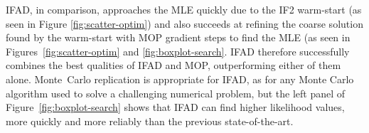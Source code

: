 \documentclass[11pt]{article}
\begin{document}
IFAD, in comparison, approaches the MLE quickly due to the IF2 warm-start (as seen in Figure \ref{fig:scatter-optim}) and also succeeds at refining the coarse solution found by the warm-start with MOP gradient steps to find the MLE (as seen in Figures~\ref{fig:scatter-optim} and \ref{fig:boxplot-search}. IFAD therefore successfully combines the best qualities of IFAD and MOP, outperforming either of them alone.
Monte~Carlo replication is appropriate for IFAD, as for any Monte Carlo algorithm used to solve a challenging numerical problem, but the left panel of Figure~\ref{fig:boxplot-search} shows that IFAD can find higher likelihood values, more quickly and more reliably than the previous state-of-the-art.
\end{document}
